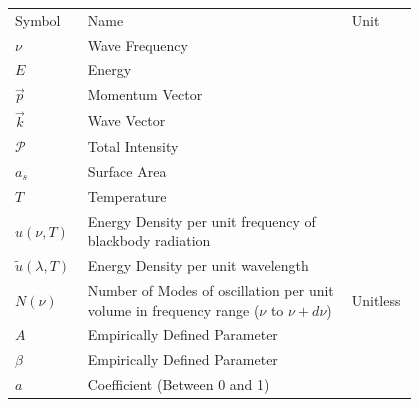 \documentclass[10pt]{article}
\begin{document}
        \begin{table}
        \centering
            \begin{tabular}{|>{\centering\arraybackslash}p{0.1\linewidth}  |>{\centering\arraybackslash}p{0.6\linewidth}  |>{\centering\arraybackslash}p{0.1\linewidth}|} \hline
                \multicolumn{3}{|c|}{Variables}\\ \hline 
                Symbol  &   Name    &   Unit\\ \hline 
                $\nu$   &   Wave Frequency  &   [$Hz$]\\ \hline 
                $E$     &   Energy  &\\ \hline 
                $\vec{p}$   &   Momentum Vector &\\ \hline 
                $\vec{k}$ & Wave Vector&\\ \hline 
                $\mathcal{P}$   &   Total Intensity   &   [$\frac{W}{m^2}$]\\ \hline 
                $a_s$   &   Surface Area    &   [$m^2$]\\ \hline 
                $T$     &   Temperature     &   [$K$]\\ \hline 
                $u(\nu, T)$&   Energy Density per unit frequency of blackbody radiation    &   [$\frac{J}{m^3 Hz}$]\\ \hline 
                $\tilde{u}(\lambda, T)$     &   Energy Density per unit wavelength  &   \\ \hline 
                $N(\nu)$    &   Number of Modes of oscillation per unit volume in frequency range ($\nu$ to $\nu+d\nu$) &   Unitless\\ \hline 
                $A$     &   Empirically Defined Parameter   &   \\ \hline 
                $\beta$ &   Empirically Defined Parameter   &   \\ \hline 
                $a$     &   Coefficient (Between 0 and 1)   &   \\ \hline
            \end{tabular}
        \label{tab:var}
        \end{table}
\end{document}
